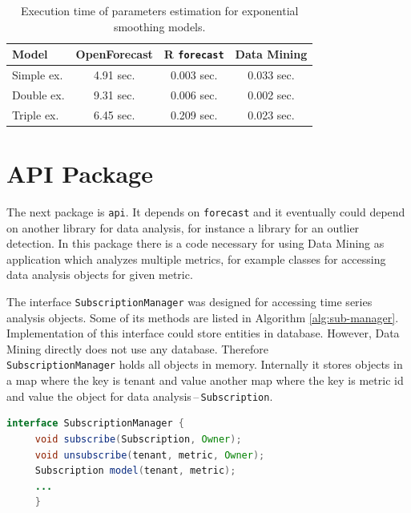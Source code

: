         \begin{table}[h]
            \begin{center}
                \begin{tabular}{l|c|c|c}
                    \textbf{Model} & \textbf{OpenForecast} & \textbf{R \texttt{forecast}} &
                        \textbf{Data Mining}\\ \hline \hline
                    Simple ex. & 4.91 sec. & 0.003 sec. & 0.033 sec.\\
                    Double ex. & 9.31 sec. & 0.006 sec. & 0.002 sec. \\
                    Triple ex. & 6.45 sec. & 0.209 sec. & 0.023 sec. \\
                \end{tabular}
                \caption{Execution time of parameters estimation for exponential smoothing models.}
                \label{tab:datamining-perf}
            \end{center}
        \end{table}

    \section{API Package}
    The next package is \texttt{api}. It depends on \texttt{forecast} and it eventually could
    depend on another library for data analysis, for instance a library for an outlier detection. In this package there
    is a code necessary for using Data Mining as application which analyzes multiple metrics, for example classes for
    accessing data analysis objects for given metric.

    The interface \texttt{SubscriptionManager} was designed for accessing time series analysis objects. Some of its
    methods are listed in Algorithm \ref{alg:sub-manager}. Implementation of this interface could store entities in
    database. However, Data Mining directly does not use any database. Therefore \\ \texttt{SubscriptionManager}
    holds all objects in memory. Internally it stores objects in a map where the key is tenant and value another
    map where the key is metric id and value the object for data analysis\,--\,\texttt{Subscription}.

    \begin{lstlisting}[caption={Interface \texttt{SubscriptionManager}.}, language=Java, label={alg:sub-manager}]
interface SubscriptionManager {
     void subscribe(Subscription, Owner);
     void unsubscribe(tenant, metric, Owner);
     Subscription model(tenant, metric);
     ...
     }
    \end{lstlisting}

